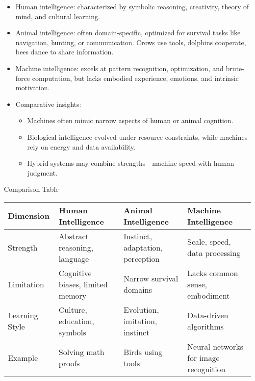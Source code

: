 \documentclass[
  letterpaper,
  DIV=11,
  numbers=noendperiod]{scrreprt}
\providecommand{\tightlist}{%
  \setlength{\itemsep}{0pt}\setlength{\parskip}{0pt}}
\begin{document}
\begin{itemize}
\item
  Human intelligence: characterized by symbolic reasoning, creativity,
  theory of mind, and cultural learning.
\item
  Animal intelligence: often domain-specific, optimized for survival
  tasks like navigation, hunting, or communication. Crows use tools,
  dolphins cooperate, bees dance to share information.
\item
  Machine intelligence: excels at pattern recognition, optimization, and
  brute-force computation, but lacks embodied experience, emotions, and
  intrinsic motivation.
\item
  Comparative insights:

  \begin{itemize}
  \tightlist
  \item
    Machines often mimic narrow aspects of human or animal cognition.
  \item
    Biological intelligence evolved under resource constraints, while
    machines rely on energy and data availability.
  \item
    Hybrid systems may combine strengths---machine speed with human
    judgment.
  \end{itemize}
\end{itemize}

Comparison Table

\begin{longtable}[]{@{}
  >{\raggedright\arraybackslash}p{}
  >{\raggedright\arraybackslash}p{}
  >{\raggedright\arraybackslash}p{}
  >{\raggedright\arraybackslash}p{}@{}}
\toprule\noalign{}
\begin{minipage}[b]{\linewidth}\raggedright
Dimension
\end{minipage} & \begin{minipage}[b]{\linewidth}\raggedright
Human Intelligence
\end{minipage} & \begin{minipage}[b]{\linewidth}\raggedright
Animal Intelligence
\end{minipage} & \begin{minipage}[b]{\linewidth}\raggedright
Machine Intelligence
\end{minipage} \\
\midrule\noalign{}
\endhead
\bottomrule\noalign{}
\endlastfoot
Strength & Abstract reasoning, language & Instinct, adaptation,
perception & Scale, speed, data processing \\
Limitation & Cognitive biases, limited memory & Narrow survival domains
& Lacks common sense, embodiment \\
Learning Style & Culture, education, symbols & Evolution, imitation,
instinct & Data-driven algorithms \\
Example & Solving math proofs & Birds using tools & Neural networks for
image recognition \\
\end{longtable}
\end{document}
